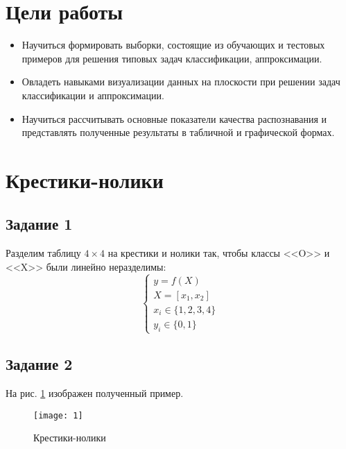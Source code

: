 





\section{Цели работы}

\begin{itemize}
	\setlength\itemsep{0em}
	\item Научиться формировать выборки, состоящие из обучающих и тестовых примеров
	для решения типовых задач классификации, аппроксимации.
	\item Овладеть навыками визуализации данных на плоскости при решении задач
	классификации и аппроксимации.
	\item Научиться рассчитывать основные показатели качества распознавания и
	представлять полученные результаты в табличной и графической формах.
\end{itemize}

\section{Крестики-нолики}

\subsection{Задание 1}

Разделим таблицу $4\times 4$ на крестики и нолики так, чтобы классы <<O>> и <<X>> были линейно неразделимы:
\begin{equation*}
\begin{cases}
	y = f(X)\\
	X = [x_1, x_2]\\
	x_i \in \{1, 2, 3, 4\}\\
	y_i \in \{0, 1\}
\end{cases}
\end{equation*}

\subsection{Задание 2}

На рис. \ref{fig:tic-tac-toe} изображен полученный пример.

\begin{figure}[H]
\begin{center}
	\texttt{[image: 1]}
	\caption{Крестики-нолики}
	\label{fig:tic-tac-toe}
\end{center}
\end{figure}

